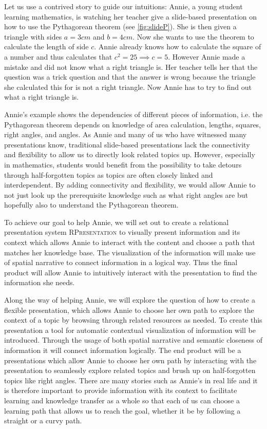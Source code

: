 \documentclass{llncs}
\newcommand{\sys}{\textsc{RPresentation}\xspace}
\begin{document}
Let us use a contrived story to guide our intuitions: Annie, a young student learning
mathematics, is watching her teacher give a slide-based presentation on how to use the
Pythagorean theorem (see \autoref{fig:slideP}). She is then given a triangle with sides
$a = 3 cm$ and $b = 4 cm$. Now she wants to use the theorem to calculate the length of
side $c$. Annie already knows how to calculate the square of a number and thus calculates
that $c^2 = 25 \implies c = 5$. However Annie made a mistake and did not know what a right
triangle is. Her teacher tells her that the question was a trick question and that the
answer is wrong because the triangle she calculated this for is not a right triangle. Now
Annie has to try to find out what a right triangle is.

Annie's example shows the dependencies of different pieces of information, i.e. the Pythagorean theorem depends on knowledge of area calculation, lengths, squares, right angles, and angles. As Annie and many of us who have witnessed many presentations know, traditional slide-based presentations lack the connectivity and flexibility to allow us to directly look related topics up. However, especially in mathematics, students would benefit from the possibility to take detours through half-forgotten topics as topics are often closely linked and interdependent. By adding connectivity and flexibility, we would allow Annie to not just look up the prerequisite knowledge such as what right angles are but hopefully also to understand the Pythagorean theorem.

To achieve our goal to help Annie, we will set out to create a relational presentation system \sys to visually present information and its context which allows Annie to interact with the content and choose a path that matches her knowledge base. The visualization of the information will make use of spatial narrative to connect information in a logical way. Thus the final product will allow Annie to intuitively interact with the presentation to find the information she needs.

Along the way of helping Annie, we will explore the question of how to create a flexible presentation, which allows Annie to choose her own path to explore the context of a topic by browsing through related resources as needed. To create this presentation a tool for automatic contextual visualization of information will be introduced. Through the usage of both spatial narrative and semantic closeness of information it will connect information logically. The end product will be a presentations which allow Annie to choose her own path by interacting with the presentation to seamlessly explore related topics and brush up on half-forgotten topics like right angles. There are many stories such as Annie's in real life and it is therefore important to provide information with its context to facilitate learning and knowledge transfer as a whole so that each of us can choose a learning path that allows us to reach the goal, whether it be by following a straight or a curvy path.
\end{document}
